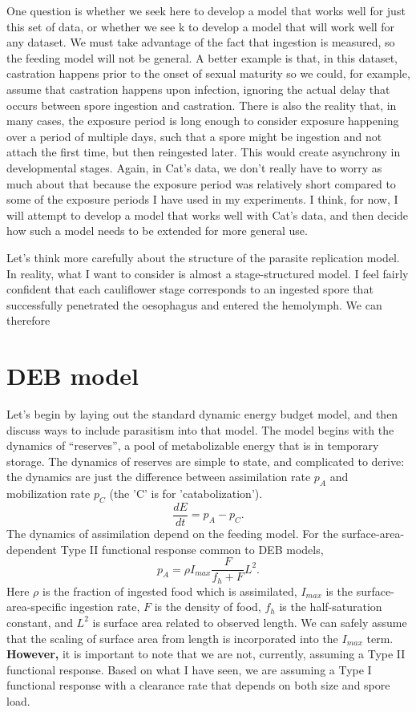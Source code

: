 \documentclass[11pt,reqno,final,pdftex]{amsart}\usepackage[]{graphicx}\usepackage[]{color}
\theoremstyle{plain}
\numberwithin{equation}{part}
\begin{document}
One question is whether we seek here to develop a model that works
well for just this set of data, or whether we see k to develop a model that will work well for any dataset.
We must take advantage of the fact that ingestion is measured, so the feeding model will not be general.
A better example is that, in this dataset, castration happens prior to the onset of sexual maturity so we could, for example, assume that castration happens upon infection, ignoring the actual delay that occurs between spore ingestion and castration.
There is also the reality that, in many cases, the exposure period is long enough to consider exposure happening over a period of multiple days, such that a spore might be ingestion and not attach the first time, but then reingested later.
This would create asynchrony in developmental stages.
Again, in Cat's data, we don't really have to worry as much about that because the exposure period was relatively short compared to some of the exposure periods I have used in my experiments.
I think, for now, I will attempt to develop a model that works well
with Cat's data, and then decide how such a model needs to be extended
for more general use.

Let's think more carefully about the structure of the parasite
replication model.
In reality, what I want to consider is almost a stage-structured
model.
I feel fairly confident that each cauliflower stage corresponds to an
ingested spore that successfully penetrated the oesophagus and entered
the hemolymph.
We can therefore


\section*{DEB model}

Let's begin by laying out the standard dynamic energy budget model, and then discuss ways to include parasitism into that model.
The model begins with the dynamics of ``reserves'', a pool of metabolizable energy that is in temporary storage.
The dynamics of reserves are simple to state, and complicated to derive: the dynamics are just the difference between assimilation rate $p_A$ and mobilization rate $p_C$ (the 'C' is for 'catabolization').
\begin{equation}
\frac{dE}{dt} = p_A - p_C.
\end{equation}
The dynamics of assimilation depend on the feeding model.
For the surface-area-dependent Type II functional response common to DEB models,
\begin{equation}
p_A = \rho I_{max} \frac{F}{f_h + F} L^2.
\end{equation}
Here $\rho$ is the fraction of ingested food which is assimilated, $I_{max}$ is the surface-area-specific ingestion rate, $F$ is the density of food, $f_h$ is the half-saturation constant, and $L^2$ is surface area related to observed length.
We can safely assume that the scaling of surface area from length is incorporated into the $I_{max}$ term.
\textbf{However,} it is important to note that we are not, currently, assuming a Type II functional response.
Based on what I have seen, we are assuming a Type I functional response with a clearance rate that depends on both size and spore load.
\end{document}

